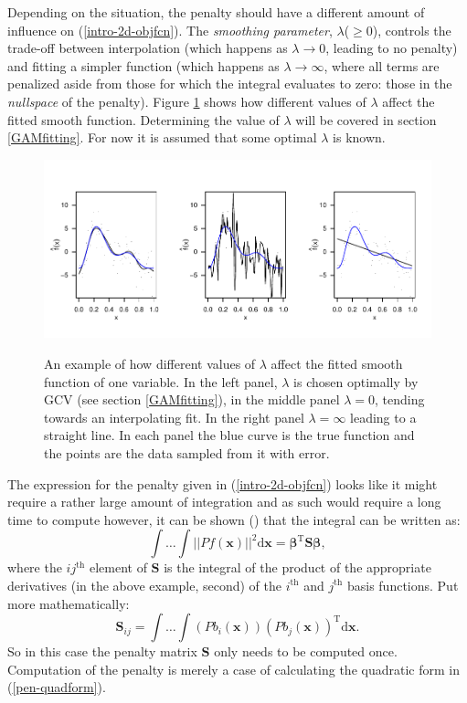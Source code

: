 Depending on the situation, the penalty should have a different amount of influence on (\ref{intro-2d-objfcn}). The \textit{smoothing parameter}, $\lambda$($\geq0$), controls the trade-off between interpolation (which happens as $\lambda \rightarrow 0$, leading to no penalty) and fitting a simpler function (which happens as $\lambda \rightarrow \infty$, where all terms are penalized aside from those for which the integral evaluates to zero: those in the \textit{nullspace} of the penalty). Figure \ref{lambda-ex} shows how different values of $\lambda$ affect the fitted smooth function. Determining the value of $\lambda$ will be covered in section \ref{GAMfitting}. For now it is assumed that some optimal $\lambda$ is known.

\begin{figure}[tb]
\centering
\includegraphics[width=6in]{intro/figs/lambda-ex.pdf}\\
\caption{An example of how different values of $\lambda$ affect the fitted smooth function of one variable. In the left panel, $\lambda$ is chosen optimally by GCV (see section \ref{GAMfitting}), in the middle panel $\lambda=0$, tending towards an interpolating fit. In the right panel $\lambda=\infty$ leading to a straight line. In each panel the blue curve is the true function and the points are the data sampled from it with error.}
\label{lambda-ex}
\end{figure}

The expression for the penalty given in (\ref{intro-2d-objfcn}) looks like it might require a rather large amount of integration and as such would require a long time to compute however, it can be shown (\cite[p. 128]{simonbook}) that the integral can be written as:
\begin{equation}
\int \dots \int \lvert \lvert P f(\mathbf{x}) \rvert \rvert^2 \text{d}\mathbf{x} = \bm{\beta}^\text{T} \mathbf{S} \bm{\beta},
\label{pen-quadform}
\end{equation}
where the $ij^\text{th}$ element of $\mathbf{S}$ is the integral of the product of the appropriate derivatives (in the above example, second) of the $i^\text{th}$ and $j^\text{th}$ basis functions. Put more mathematically:
\begin{equation*}
\mathbf{S}_{ij} = \int \dots \int \left(Pb_{i}(\mathbf{x})\right ) \left (Pb_{j}(\mathbf{x}) \right )^\text{T}  \text{d}\mathbf{x}.
\end{equation*}
So in this case the penalty matrix $\mathbf{S}$ only needs to be computed once. Computation of the penalty is merely a case of calculating the quadratic form in (\ref{pen-quadform}).

